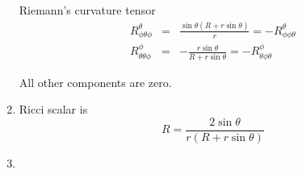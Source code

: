 \documentclass[12pt,a4paper]{article}
\begin{document}
\begin{enumerate}
Riemann's curvature tensor
\begin{eqnarray*}
	R^\theta_{\phi\theta\phi} &=& \frac{\sin\theta(R+r\sin\theta)}{r} = -	R^{\theta}_{\phi\phi\theta} \\
	R^\phi_{\theta\theta\phi} &=& -\frac{r\sin\theta}{R+r\sin\theta} = -R^\phi_{\theta\phi\theta}
\end{eqnarray*}

All other components are zero.




\item

Ricci scalar is
\begin{equation*}
	R=\frac{2\sin\theta}{r(R+r\sin\theta)}
\end{equation*}



\item












\end{enumerate}
\end{document}
